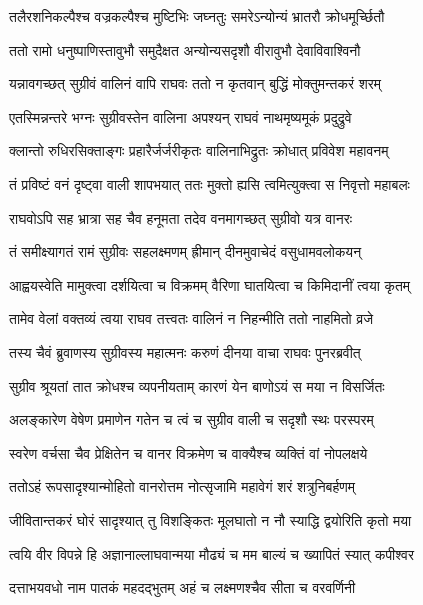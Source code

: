\twolineshloka
{तलैरशनिकल्पैश्च वज्रकल्पैश्च मुष्टिभिः}
{जघ्नतुः समरेऽन्योन्यं भ्रातरौ क्रोधमूर्च्छितौ} %

\twolineshloka
{ततो रामो धनुष्पाणिस्तावुभौ समुदैक्षत}
{अन्योन्यसदृशौ वीरावुभौ देवाविवाश्विनौ} %

\twolineshloka
{यन्नावगच्छत् सुग्रीवं वालिनं वापि राघवः}
{ततो न कृतवान् बुद्धिं मोक्तुमन्तकरं शरम्} %

\twolineshloka
{एतस्मिन्नन्तरे भग्नः सुग्रीवस्तेन वालिना}
{अपश्यन् राघवं नाथमृष्यमूकं प्रदुद्रुवे} %

\twolineshloka
{क्लान्तो रुधिरसिक्ताङ्गः प्रहारैर्जर्जरीकृतः}
{वालिनाभिद्रुतः क्रोधात् प्रविवेश महावनम्} %

\twolineshloka
{तं प्रविष्टं वनं दृष्ट्वा वाली शापभयात् ततः}
{मुक्तो ह्यसि त्वमित्युक्त्वा स निवृत्तो महाबलः} %

\twolineshloka
{राघवोऽपि सह भ्रात्रा सह चैव हनूमता}
{तदेव वनमागच्छत् सुग्रीवो यत्र वानरः} %

\twolineshloka
{तं समीक्ष्यागतं रामं सुग्रीवः सहलक्ष्मणम्}
{ह्रीमान् दीनमुवाचेदं वसुधामवलोकयन्} %

\twolineshloka
{आह्वयस्वेति मामुक्त्वा दर्शयित्वा च विक्रमम्}
{वैरिणा घातयित्वा च किमिदानीं त्वया कृतम्} %

\twolineshloka
{तामेव वेलां वक्तव्यं त्वया राघव तत्त्वतः}
{वालिनं न निहन्मीति ततो नाहमितो व्रजे} %

\twolineshloka
{तस्य चैवं ब्रुवाणस्य सुग्रीवस्य महात्मनः}
{करुणं दीनया वाचा राघवः पुनरब्रवीत्} %

\twolineshloka
{सुग्रीव श्रूयतां तात क्रोधश्च व्यपनीयताम्}
{कारणं येन बाणोऽयं स मया न विसर्जितः} %

\twolineshloka
{अलङ्कारेण वेषेण प्रमाणेन गतेन च}
{त्वं च सुग्रीव वाली च सदृशौ स्थः परस्परम्} %

\twolineshloka
{स्वरेण वर्चसा चैव प्रेक्षितेन च वानर}
{विक्रमेण च वाक्यैश्च व्यक्तिं वां नोपलक्षये} %

\twolineshloka
{ततोऽहं रूपसादृश्यान्मोहितो वानरोत्तम}
{नोत्सृजामि महावेगं शरं शत्रुनिबर्हणम्} %

\twolineshloka
{जीवितान्तकरं घोरं सादृश्यात् तु विशङ्कितः}
{मूलघातो न नौ स्याद्धि द्वयोरिति कृतो मया} %

\twolineshloka
{त्वयि वीर विपन्ने हि अज्ञानाल्लाघवान्मया}
{मौढ्यं च मम बाल्यं च ख्यापितं स्यात् कपीश्वर} %

\twolineshloka
{दत्ताभयवधो नाम पातकं महदद्भुतम्}
{अहं च लक्ष्मणश्चैव सीता च वरवर्णिनी} %

